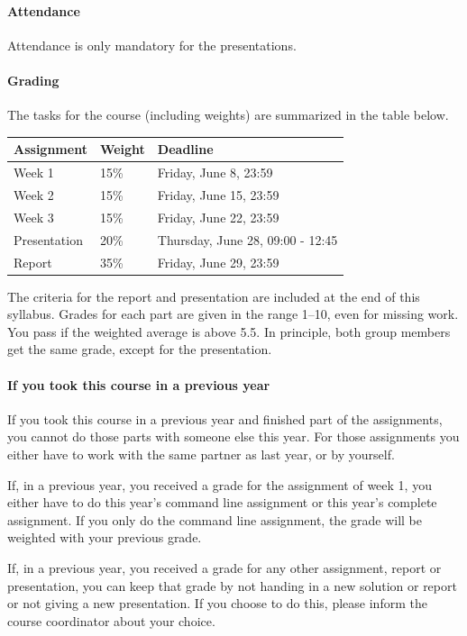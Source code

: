 \documentclass[a4paper]{report}
\begin{document}
\paragraph{Attendance}
Attendance is only mandatory for the presentations.

\paragraph{Grading}
The tasks for the course (including weights) are summarized in the table below.

\begin{table}[h!]
	\begin{tabular}{| l | l | l |}
		\hline
		\textbf{Assignment} & \textbf{Weight}	& \textbf{Deadline}					\\
		\hline
		Week 1				&	15\%			& Friday, June 8, 23:59				\\
		\hline
		Week 2				&	15\%			& Friday, June 15, 23:59			\\
		\hline
		Week 3				&	15\%			& Friday, June 22, 23:59			\\
		\hline
		Presentation		&	20\%			& Thursday, June 28, 09:00 - 12:45	\\
		\hline
		Report				&	35\%			& Friday, June 29, 23:59			\\
		\hline
	\end{tabular}
\end{table}
The criteria for the report and presentation are included at the end of this syllabus. Grades for each part are given in the range 1--10, even for missing work. You pass if the weighted average is above 5.5. In principle, both group members get the same grade, except for the presentation.

\paragraph{If you took this course in a previous year}
If you took this course in a previous year and finished part of the assignments, you cannot do those parts with someone else this year. For those assignments you either have to work with the same partner as last year, or by yourself.

If, in a previous year, you received a grade for the assignment of week 1, you either have to do this year's command line assignment or this year's complete assignment. If you only do the command line assignment, the grade will be weighted with your previous grade.

If, in a previous year, you received a grade for any other assignment, report or presentation, you can keep that grade by not handing in a new solution or report or not giving a new presentation. If you choose to do this, please inform the course coordinator about your choice.
\end{document}
